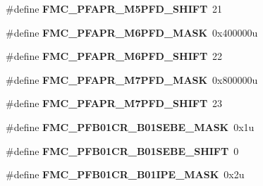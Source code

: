 \begin{DoxyCompactItemize}
\item 
\hypertarget{group___f_m_c___register___masks_ga1efe3150392c8b3b9e4f42ec43bfef39}{}\#define {\bfseries F\+M\+C\+\_\+\+P\+F\+A\+P\+R\+\_\+\+M5\+P\+F\+D\+\_\+\+S\+H\+I\+F\+T}~21\label{group___f_m_c___register___masks_ga1efe3150392c8b3b9e4f42ec43bfef39}

\item 
\hypertarget{group___f_m_c___register___masks_ga6d5a68ef8363082c0c7077c380e7aad6}{}\#define {\bfseries F\+M\+C\+\_\+\+P\+F\+A\+P\+R\+\_\+\+M6\+P\+F\+D\+\_\+\+M\+A\+S\+K}~0x400000u\label{group___f_m_c___register___masks_ga6d5a68ef8363082c0c7077c380e7aad6}

\item 
\hypertarget{group___f_m_c___register___masks_ga5ff1d949214bab253e7b426ca8fb6884}{}\#define {\bfseries F\+M\+C\+\_\+\+P\+F\+A\+P\+R\+\_\+\+M6\+P\+F\+D\+\_\+\+S\+H\+I\+F\+T}~22\label{group___f_m_c___register___masks_ga5ff1d949214bab253e7b426ca8fb6884}

\item 
\hypertarget{group___f_m_c___register___masks_gac0652379651a8388e65f2e96358b72f1}{}\#define {\bfseries F\+M\+C\+\_\+\+P\+F\+A\+P\+R\+\_\+\+M7\+P\+F\+D\+\_\+\+M\+A\+S\+K}~0x800000u\label{group___f_m_c___register___masks_gac0652379651a8388e65f2e96358b72f1}

\item 
\hypertarget{group___f_m_c___register___masks_ga4589e8d60db033a3ab174e976a5d3dcf}{}\#define {\bfseries F\+M\+C\+\_\+\+P\+F\+A\+P\+R\+\_\+\+M7\+P\+F\+D\+\_\+\+S\+H\+I\+F\+T}~23\label{group___f_m_c___register___masks_ga4589e8d60db033a3ab174e976a5d3dcf}

\item 
\hypertarget{group___f_m_c___register___masks_ga796cd5ea0034c1eed9da71f746d8a27a}{}\#define {\bfseries F\+M\+C\+\_\+\+P\+F\+B01\+C\+R\+\_\+\+B01\+S\+E\+B\+E\+\_\+\+M\+A\+S\+K}~0x1u\label{group___f_m_c___register___masks_ga796cd5ea0034c1eed9da71f746d8a27a}

\item 
\hypertarget{group___f_m_c___register___masks_gad4c7d9cfcb89de971bb489faf8f95c2f}{}\#define {\bfseries F\+M\+C\+\_\+\+P\+F\+B01\+C\+R\+\_\+\+B01\+S\+E\+B\+E\+\_\+\+S\+H\+I\+F\+T}~0\label{group___f_m_c___register___masks_gad4c7d9cfcb89de971bb489faf8f95c2f}

\item 
\hypertarget{group___f_m_c___register___masks_ga967e1a40f9eba416f5d52039dba4562a}{}\#define {\bfseries F\+M\+C\+\_\+\+P\+F\+B01\+C\+R\+\_\+\+B01\+I\+P\+E\+\_\+\+M\+A\+S\+K}~0x2u\label{group___f_m_c___register___masks_ga967e1a40f9eba416f5d52039dba4562a}


\end{DoxyCompactItemize}
